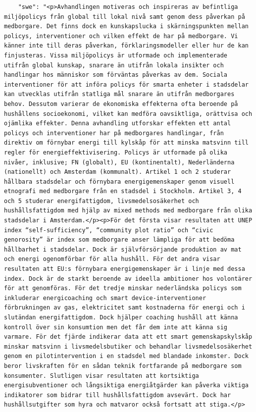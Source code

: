 \begin{casestudySection}
\begin{lstlisting}
    "swe": "<p>Avhandlingen motiveras och inspireras av befintliga miljöpolicys från global till lokal nivå samt genom dess påverkan på medborgare. Det finns dock en kunskapslucka i skärningspunkten mellan policys, interventioner och vilken effekt de har på medborgare. Vi känner inte till deras påverkan, förklaringsmodeller eller hur de kan finjusteras. Vissa miljöpolicys är utformade och implementerade utifrån global kunskap, snarare än utifrån lokala insikter och handlingar hos människor som förväntas påverkas av dem. Sociala interventioner för att införa policys för smarta enheter i stadsdelar kan utvecklas utifrån statliga mål snarare än utifrån medborgares behov. Dessutom varierar de ekonomiska effekterna ofta beroende på hushållens socioekonomi, vilket kan medföra oavsiktliga, orättvisa och ojämlika effekter. Denna avhandling utforskar effekten ett antal policys och interventioner har på medborgares handlingar, från direktiv om förnybar energi till kylskåp för att minska matsvinn till regler för energieffektivisering. Policys är utformade på olika nivåer, inklusive; FN (globalt), EU (kontinentalt), Nederländerna (nationellt) och Amsterdam (kommunalt). Artikel 1 och 2 studerar hållbara stadsdelar och förnybara energigemenskaper genom visuell etnografi med medborgare från en stadsdel i Stockholm. Artikel 3, 4 och 5 studerar energifattigdom, livsmedelsosäkerhet och hushållsfattigdom med hjälp av mixed methods med medborgare från olika stadsdelar i Amsterdam.</p><p>För det första visar resultaten att UNEP index “self-sufficiency”, “community plot ratio” och “civic genorosity” är index som medborgare anser lämpliga för att bedöma hållbarhet i stadsdelar. Dock är självförsörjande produktion av mat och energi ogenomförbar för alla hushåll. För det andra visar resultaten att EU:s förnybara energigemenskaper är i linje med dessa index. Dock är de starkt beroende av ideella ambitioner hos volontärer för att genomföras. För det tredje minskar nederländska policys som inkluderar energicoaching och smart device-interventioner förbrukningen av gas, elektricitet samt kostnaderna för energi och i slutändan energifattigdom. Dock hjälper coaching hushåll att känna kontroll över sin konsumtion men det får dem inte att känna sig varmare. För det fjärde indikerar data att ett smart gemenskapskylskåp minskar matsvinn i livsmedelsbutiker och behandlar livsmedelsosäkerhet genom en pilotintervention i en stadsdel med blandade inkomster. Dock beror livskraften för en sådan teknik fortfarande på medborgare som konsumenter. Slutligen visar resultaten att kortsiktiga energisubventioner och långsiktiga energiåtgärder kan påverka viktiga indikatorer som bidrar till hushållsfattigdom avsevärt. Dock har hushållsutgifter som hyra och matvaror också fortsatt att stiga.</p>

\end{lstlisting}
\end{casestudySection}
